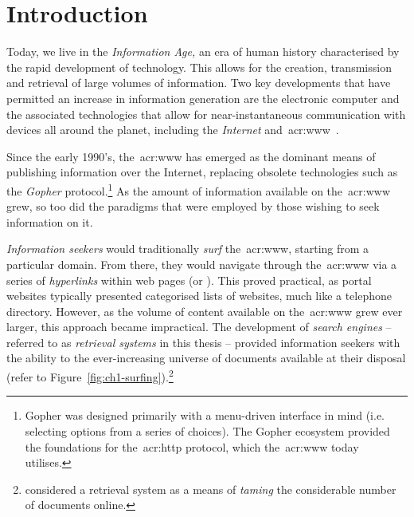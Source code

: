 
\chapter{Introduction}\label{chap:intro}

Today, we live in the \emph{Information Age,} an era of human history characterised by the rapid development of technology. This allows for the creation, transmission and retrieval of large volumes of information. Two key developments that have permitted an increase in information generation are the electronic computer and the associated technologies that allow for near-instantaneous communication with devices all around the planet, including the \emph{Internet} and~\gls{acr:www}~\citep{berners1994www}.

\begin{figure}[h]
    \centering
    \vspace{5mm}
    \label{fig:earth_satellites}
    \vspace{-4mm}
\end{figure}

Since the early 1990's, the~\gls{acr:www} has emerged as the dominant means of publishing information over the Internet, replacing obsolete technologies such as the \emph{Gopher} protocol.\footnote{Gopher was designed primarily with a menu-driven interface in mind (i.e. selecting options from a series of choices). The Gopher ecosystem provided the foundations for the~\gls{acr:http} protocol, which the~\gls{acr:www} today utilises.} As the amount of information available on the~\gls{acr:www} grew, so too did the paradigms that were employed by those wishing to seek information on it.

\emph{Information seekers} would traditionally \emph{surf} the~\gls{acr:www}, starting from a particular domain. From there, they would navigate through the~\gls{acr:www} via a series of \emph{hyperlinks} within web pages (or \emph{}). This proved practical, as portal websites typically presented categorised lists of websites, much like a telephone directory. However, as the volume of content available on the~\gls{acr:www} grew ever larger, this approach became impractical. The development of \emph{search engines} -- referred to as \emph{retrieval systems} in this thesis -- provided information seekers with the ability to  the ever-increasing universe of documents available at their disposal (refer to Figure~\ref{fig:ch1-surfing}).\footnote{\cite{mcbryan1994taming_tools} considered a retrieval system as a means of \emph{taming} the considerable number of documents online.}

